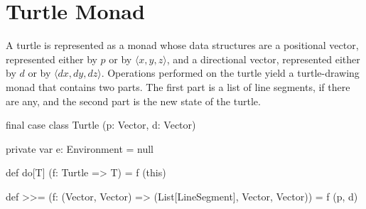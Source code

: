 \documentclass{article}
\begin{document}
  \section{Turtle Monad}
    \label{sec:turtle-monad}

    A turtle is represented as a monad whose data structures are a positional vector, represented either by $p$ or by $\langle x, y, z \rangle$, and a
    directional vector, represented either by $d$ or by $\langle dx, dy, dz \rangle$. Operations performed on the turtle yield a turtle-drawing monad that
    contains two parts. The first part is a list of line segments, if there are any, and the second part is the new state of the turtle.

    \begin{scalacode}
final case class Turtle (p: Vector, d: Vector) {
  private var e: Environment = null

  def do[T] (f: Turtle => T) = f (this)

  def >>= (f: (Vector, Vector) => (List[LineSegment], Vector, Vector)) = f (p, d)
}
    \end{scalacode}

\end{document}
